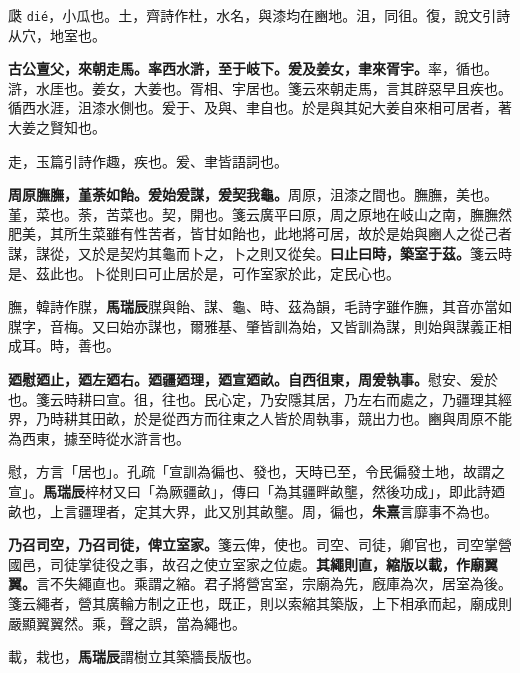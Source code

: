 \begin{quoting}瓞 \texttt{dié}，小瓜也。土，齊詩作杜，水名，與漆均在豳地。沮，同徂。復，說文引詩从穴，地室也。\end{quoting}

\textbf{古公亶父，來朝走馬。率西水滸，至于岐下。爰及姜女，聿來胥宇。}{\footnotesize 率，循也。滸，水厓也。姜女，大姜也。胥相、宇居也。箋云來朝走馬，言其辟惡早且疾也。循西水涯，沮漆水側也。爰于、及與、聿自也。於是與其妃大姜自來相可居者，著大姜之賢知也。}

\begin{quoting}走，玉篇引詩作趣，疾也。爰、聿皆語詞也。\end{quoting}

\textbf{周原膴膴，堇荼如飴。爰始爰謀，爰契我龜。}{\footnotesize 周原，沮漆之間也。膴膴，美也。堇，菜也。荼，苦菜也。契，開也。箋云廣平曰原，周之原地在岐山之南，膴膴然肥美，其所生菜雖有性苦者，皆甘如飴也，此地將可居，故於是始與豳人之從己者謀，謀從，又於是契灼其龜而卜之，卜之則又從矣。}\textbf{曰止曰時，築室于茲。}{\footnotesize 箋云時是、茲此也。卜從則曰可止居於是，可作室家於此，定民心也。}

\begin{quoting}膴，韓詩作腜，\textbf{馬瑞辰}腜與飴、謀、龜、時、茲為韻，毛詩字雖作膴，其音亦當如腜字，音梅。又曰始亦謀也，爾雅基、肇皆訓為始，又皆訓為謀，則始與謀義正相成耳。時，善也。\end{quoting}

\textbf{廼慰廼止，廼左廼右。廼疆廼理，廼宣廼畝。自西徂東，周爰執事。}{\footnotesize 慰安、爰於也。箋云時耕曰宣。徂，往也。民心定，乃安隱其居，乃左右而處之，乃疆理其經界，乃時耕其田畝，於是從西方而往東之人皆於周執事，競出力也。豳與周原不能為西東，據至時從水滸言也。}

\begin{quoting}慰，方言「居也」。孔疏「宣訓為徧也、發也，天時已至，令民徧發土地，故謂之宣」。\textbf{馬瑞辰}梓材又曰「為厥疆畝」，傳曰「為其疆畔畝壟，然後功成」，即此詩廼畝也，上言疆理者，定其大界，此又別其畝壟。周，徧也，\textbf{朱熹}言靡事不為也。\end{quoting}

\textbf{乃召司空，乃召司徒，俾立室家。}{\footnotesize 箋云俾，使也。司空、司徒，卿官也，司空掌營國邑，司徒掌徒役之事，故召之使立室家之位處。}\textbf{其繩則直，縮版以載，作廟翼翼。}{\footnotesize 言不失繩直也。乘謂之縮。君子將營宮室，宗廟為先，廐庫為次，居室為後。箋云繩者，營其廣輪方制之正也，既正，則以索縮其築版，上下相承而起，廟成則嚴顯翼翼然。乘，聲之誤，當為繩也。}

\begin{quoting}載，栽也，\textbf{馬瑞辰}謂樹立其築牆長版也。\end{quoting}

